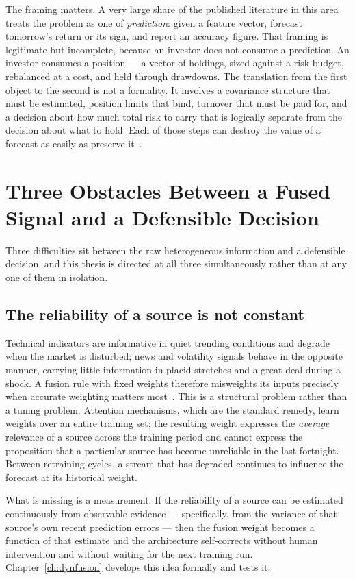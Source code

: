 The framing matters. A very large share of the published literature in this area treats the
problem as one of \emph{prediction}: given a feature vector, forecast tomorrow's return or
its sign, and report an accuracy figure. That framing is legitimate but incomplete, because
an investor does not consume a prediction. An investor consumes a position --- a vector of
holdings, sized against a risk budget, rebalanced at a cost, and held through drawdowns.
The translation from the first object to the second is not a formality. It involves a
covariance structure that must be estimated, position limits that bind, turnover that must
be paid for, and a decision about how much total risk to carry that is logically separate
from the decision about what to hold. Each of those steps can destroy the value of a
forecast as easily as preserve it~\cite{demiguel2009,gu2020,markowitz1952}.

\section{Three Obstacles Between a Fused Signal and a Defensible Decision}

Three difficulties sit between the raw heterogeneous information and a defensible decision,
and this thesis is directed at all three simultaneously rather than at any one of them in
isolation.

\subsection{The reliability of a source is not constant}

Technical indicators are informative in quiet trending conditions and degrade when the
market is disturbed; news and volatility signals behave in the opposite manner, carrying
little information in placid stretches and a great deal during a shock. A fusion rule with
fixed weights therefore misweights its inputs precisely when accurate weighting matters
most~\cite{farimani2024,tai2022}. This is a structural problem rather than a tuning problem.
Attention mechanisms, which are the standard remedy, learn weights over an entire training
set; the resulting weight expresses the \emph{average} relevance of a source across the
training period and cannot express the proposition that a particular source has become
unreliable in the last fortnight. Between retraining cycles, a stream that has degraded
continues to influence the forecast at its historical weight.

What is missing is a measurement. If the reliability of a source can be estimated
continuously from observable evidence --- specifically, from the variance of that source's
own recent prediction errors --- then the fusion weight becomes a function of that estimate
and the architecture self-corrects without human intervention and without waiting for the
next training run. Chapter~\ref{ch:dynfusion} develops this idea formally and tests it.


